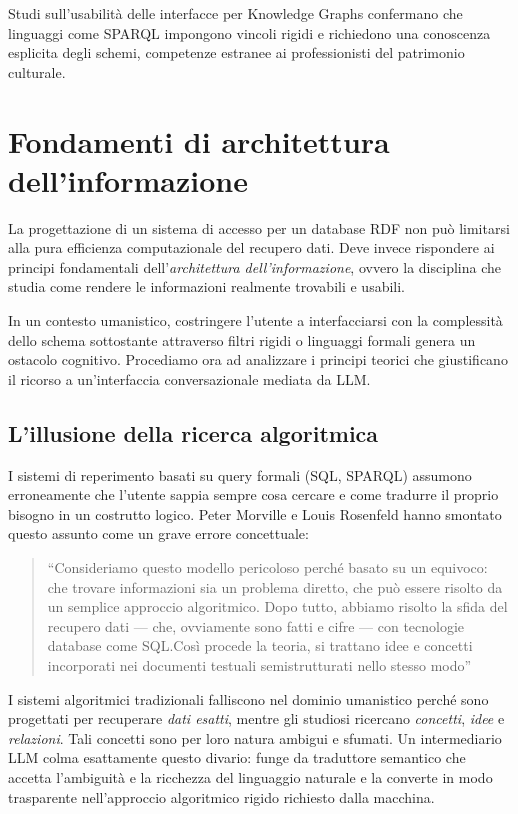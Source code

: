 \documentclass[12pt,a4paper,oneside]{book}
\begin{document}
Studi sull'usabilità delle interfacce per Knowledge Graphs confermano che linguaggi come SPARQL impongono vincoli rigidi e richiedono una conoscenza esplicita degli schemi, competenze estranee ai professionisti del patrimonio culturale\cite{Vas25}.
\newpage
\section{Fondamenti di architettura dell'informazione}\label{sec:archinfo}
La progettazione di un sistema di accesso per un database RDF non può limitarsi alla pura efficienza computazionale del recupero dati. Deve invece rispondere ai principi fondamentali dell'\textit{architettura dell'informazione}, ovvero la disciplina che studia come rendere le informazioni realmente trovabili e usabili.

In un contesto umanistico, costringere l'utente a interfacciarsi con la complessità dello schema sottostante attraverso filtri rigidi o linguaggi formali genera un ostacolo cognitivo.
Procediamo ora ad analizzare i principi teorici che giustificano il ricorso a un'interfaccia conversazionale mediata da LLM.\@

    \subsection{L'illusione della ricerca algoritmica}\label{subsec:illusione}

    I sistemi di reperimento basati su query formali (SQL, SPARQL) assumono erroneamente che l'utente sappia sempre cosa cercare e come tradurre il proprio bisogno in un costrutto logico. Peter Morville e Louis Rosenfeld hanno smontato questo assunto come un grave errore concettuale:

    \begin{quotation}
    ``Consideriamo questo modello pericoloso perché basato su un equivoco: che trovare informazioni sia un problema diretto, che può essere risolto da un semplice approccio algoritmico. Dopo tutto, abbiamo risolto la sfida del recupero dati --- che, ovviamente sono fatti e cifre --- con tecnologie database come SQL.\@ Così procede la teoria, si trattano idee e concetti incorporati nei documenti testuali semistrutturati nello stesso modo''\hfill\cite{Mor08}
    \end{quotation}

    I sistemi algoritmici tradizionali falliscono nel dominio umanistico perché sono progettati per recuperare \textit{dati esatti}, mentre gli studiosi ricercano \textit{concetti}, \textit{idee} e \textit{relazioni}. Tali concetti sono per loro natura ambigui e sfumati. Un intermediario LLM colma esattamente questo divario: funge da traduttore semantico che accetta l'ambiguità e la ricchezza del linguaggio naturale e la converte in modo trasparente nell'approccio algoritmico rigido richiesto dalla macchina.
\end{document}
